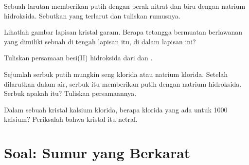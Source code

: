 \begin{exercise}[$\star\star$]\label{exo:g9:ions:8}
Sebuah larutan memberikan  putih dengan perak nitrat dan 
biru dengan natrium hidroksida. Sebutkan  yang terlarut dan
tuliskan rumusnya.
\end{exercise}

\begin{exercise}[$\star\star$]\label{exo:g9:ions:9}
Lihatlah gambar lapisan kristal garam. Berapa tetangga bermuatan
berlawanan yang dimiliki sebuah  di tengah lapisan itu, di dalam
lapisan ini?
\end{exercise}

\begin{exercise}[$\star\star$]\label{exo:g9:ions:10}
Tuliskan persamaan  besi(II) hidroksida dari 
 dan .
\end{exercise}

\begin{exercise}[$\star\star\star$]\label{exo:g9:ions:11}
Sejumlah serbuk putih mungkin seng klorida atau natrium klorida. Setelah
dilarutkan dalam air, serbuk itu memberikan  putih dengan natrium
hidroksida. Serbuk apakah itu? Tuliskan persamaannya.
\end{exercise}

\begin{exercise}[$\star\star\star$]\label{exo:g9:ions:12}
Dalam sebuah kristal kalsium klorida, berapa  klorida yang ada untuk
1000  kalsium? Periksalah bahwa kristal itu netral.
\end{exercise}

\section{Soal: Sumur yang Berkarat}

